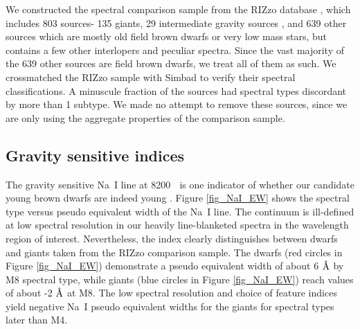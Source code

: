 We constructed the spectral comparison sample from the RIZzo database \citep{cruz_kelle_2014_10721}, which includes 803 sources- 135 giants, 29 intermediate gravity sources \citep{2009AJ....137.3345C}, and 639 other sources which are mostly old field brown dwarfs or very low mass stars, but contains a few other interlopers and peculiar spectra.  Since the vast majority of the 639 other sources are field brown dwarfs, we treat all of them as such.  We crossmatched the RIZzo sample with Simbad to verify their spectral classifications.  A minuscule fraction of the sources had spectral types discordant by more than 1 subtype.  We made no attempt to remove these sources, since we are only using the aggregate properties of the comparison sample.

\subsection{Gravity sensitive indices}
The gravity sensitive Na~I line at 8200 \angstrom$\;$ is one indicator of whether our candidate young brown dwarfs are indeed young \citep{1999ApJ...525..466L,2007AJ....134.2398C,2009AJ....137.3345C}.  Figure \ref{fig_NaI_EW} shows the spectral type versus pseudo equivalent width of the Na~I line.  The continuum is ill-defined at low spectral resolution in our heavily line-blanketed spectra in the wavelength region of interest.  Nevertheless, the index clearly distinguishes between dwarfs and giants taken from the RIZzo comparison sample.  The dwarfs (red circles in Figure \ref{fig_NaI_EW}) demonstrate a pseudo equivalent width of about 6 $\mbox{\normalfont\AA}$ by M8 spectral type, while giants (blue circles in Figure \ref{fig_NaI_EW}) reach values of about -2 $\mbox{\normalfont\AA}$ at M8.  The low spectral resolution and choice of feature indices yield negative Na~I pseudo equivalent widths for the giants for spectral types later than M4.

